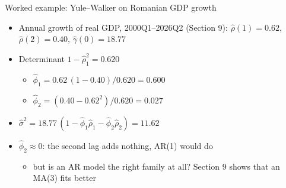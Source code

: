 \begin{frame}{Worked example: Yule--Walker on Romanian GDP growth}
\itemsize{\footnotesize}
\begin{itemize}
    \item Annual growth of real GDP, 2000Q1--2026Q2 (Section 9): $\hat\rho(1) = 0.62$, $\hat\rho(2) = 0.40$, $\hat\gamma(0) = 18.77$
    \item Determinant $1 - \hat\rho_1^2 = 0.620$
    \begin{itemize}
        \item $\hat\phi_1 = 0.62\,(1 - 0.40)/0.620 = 0.600$
        \item $\hat\phi_2 = (0.40 - 0.62^2)/0.620 = 0.027$
    \end{itemize}
    \item $\hat\sigma^2 = 18.77\,(1 - \hat\phi_1\hat\rho_1 - \hat\phi_2\hat\rho_2) = 11.62$
    \item $\hat\phi_2 \approx 0$: the second lag adds nothing, AR(1) would do
    \begin{itemize}
        \item but is an AR model the right family at all? Section 9 shows that an MA(3) fits better
    \end{itemize}
\end{itemize}
\end{frame}

